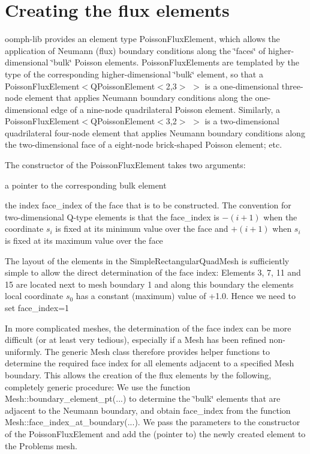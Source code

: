  

\hypertarget{index_create_flux}{}\section{Creating the flux elements}\label{index_create_flux}
{\ttfamily oomph-\/lib} provides an element type {\ttfamily Poisson\+Flux\+Element}, which allows the application of Neumann (flux) boundary conditions along the \char`\"{}faces\char`\"{} of higher-\/dimensional \char`\"{}bulk\char`\"{} Poisson elements. {\ttfamily Poisson\+Flux\+Elements} are templated by the type of the corresponding higher-\/dimensional \char`\"{}bulk\char`\"{} element, so that a {\ttfamily Poisson\+Flux\+Element$<$Q\+Poisson\+Element$<$2,3$>$} $>$ is a one-\/dimensional three-\/node element that applies Neumann boundary conditions along the one-\/dimensional edge of a nine-\/node quadrilateral Poisson element. Similarly, a {\ttfamily Poisson\+Flux\+Element$<$Q\+Poisson\+Element$<$3,2$>$} $>$ is a two-\/dimensional quadrilateral four-\/node element that applies Neumann boundary conditions along the two-\/dimensional face of a eight-\/node brick-\/shaped Poisson element; etc.

The constructor of the {\ttfamily Poisson\+Flux\+Element} takes two arguments\+:
\begin{DoxyItemize}
\item a pointer to the corresponding bulk element
\item the index {\ttfamily face\+\_\+index} of the face that is to be constructed. The convention for two-\/dimensional Q-\/type elements is that the face\+\_\+index is $ -(i+1) $ when the coordinate $ s_i $ is fixed at its minimum value over the face and $ +(i+1) $ when $ s_i $ is fixed at its maximum value over the face
\end{DoxyItemize}The layout of the elements in the {\ttfamily Simple\+Rectangular\+Quad\+Mesh} is sufficiently simple to allow the direct determination of the face index\+: Elements 3, 7, 11 and 15 are located next to mesh boundary 1 and along this boundary the element\textquotesingle{}s local coordinate $ s_0 $ has a constant (maximum) value of +1.0. Hence we need to set {\ttfamily face\+\_\+index=1} 

In more complicated meshes, the determination of the face index can be more difficult (or at least very tedious), especially if a {\ttfamily Mesh} has been refined non-\/uniformly. The generic {\ttfamily Mesh} class therefore provides helper functions to determine the required face index for all elements adjacent to a specified {\ttfamily Mesh} boundary. This allows the creation of the flux elements by the following, completely generic procedure\+: We use the function {\ttfamily Mesh\+::boundary\+\_\+element\+\_\+pt}(...) to determine the \char`\"{}bulk\char`\"{} elements that are adjacent to the Neumann boundary, and obtain {\ttfamily face\+\_\+index} from the function {\ttfamily Mesh\+::face\+\_\+index\+\_\+at\+\_\+boundary}(...). We pass the parameters to the constructor of the {\ttfamily Poisson\+Flux\+Element} and add the (pointer to) the newly created element to the {\ttfamily Problem\textquotesingle{}s} mesh.


